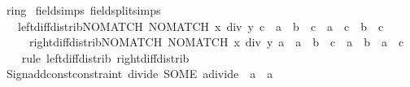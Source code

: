 \begin{isabellebody}
\isanewline
\isanewline
{}\isamarkupfalse%
\ ring\isanewline
{}\isanewline
\isanewline
{}\isamarkupfalse%
\ {\isacharbrackleft}{\kern0pt}field{\isacharunderscore}{\kern0pt}simps{\isacharcomma}{\kern0pt}\ field{\isacharunderscore}{\kern0pt}split{\isacharunderscore}{\kern0pt}simps{\isacharbrackright}{\kern0pt}{\isacharcolon}{\kern0pt}\isanewline
\ \ \ left{\isacharunderscore}{\kern0pt}diff{\isacharunderscore}{\kern0pt}distrib{\isacharunderscore}{\kern0pt}NO{\isacharunderscore}{\kern0pt}MATCH{\isacharcolon}{\kern0pt}\ {\isachardoublequoteopen}NO{\isacharunderscore}{\kern0pt}MATCH\ {\isacharparenleft}{\kern0pt}x\ div\ y{\isacharparenright}{\kern0pt}\ c\ {\isasymLongrightarrow}\ {\isacharparenleft}{\kern0pt}a\ {\isacharminus}{\kern0pt}\ b{\isacharparenright}{\kern0pt}\ {\isacharasterisk}{\kern0pt}\ c\ {\isacharequal}{\kern0pt}\ a\ {\isacharasterisk}{\kern0pt}\ c\ {\isacharminus}{\kern0pt}\ b\ {\isacharasterisk}{\kern0pt}\ c{\isachardoublequoteclose}\isanewline
\ \ \ \ \ right{\isacharunderscore}{\kern0pt}diff{\isacharunderscore}{\kern0pt}distrib{\isacharunderscore}{\kern0pt}NO{\isacharunderscore}{\kern0pt}MATCH{\isacharcolon}{\kern0pt}\ {\isachardoublequoteopen}NO{\isacharunderscore}{\kern0pt}MATCH\ {\isacharparenleft}{\kern0pt}x\ div\ y{\isacharparenright}{\kern0pt}\ a\ {\isasymLongrightarrow}\ a\ {\isacharasterisk}{\kern0pt}\ {\isacharparenleft}{\kern0pt}b\ {\isacharminus}{\kern0pt}\ c{\isacharparenright}{\kern0pt}\ {\isacharequal}{\kern0pt}\ a\ {\isacharasterisk}{\kern0pt}\ b\ {\isacharminus}{\kern0pt}\ a\ {\isacharasterisk}{\kern0pt}\ c{\isachardoublequoteclose}\isanewline
%
\isadelimproof
\ \ %
\endisadelimproof
%
\isatagproof
{}\isamarkupfalse%
\ {\isacharparenleft}{\kern0pt}rule\ left{\isacharunderscore}{\kern0pt}diff{\isacharunderscore}{\kern0pt}distrib\ right{\isacharunderscore}{\kern0pt}diff{\isacharunderscore}{\kern0pt}distrib{\isacharparenright}{\kern0pt}{\isacharplus}{\kern0pt}%
\endisatagproof
{\isafoldproof}%
%
\isadelimproof
\isanewline
%
\endisadelimproof
\isanewline
{}\isamarkupfalse%
\isanewline
%
\isadelimML
\isanewline
%
\endisadelimML
%
\isatagML
{}\isamarkupfalse%
\ {\isacartoucheopen}Sign{\isachardot}{\kern0pt}add{\isacharunderscore}{\kern0pt}const{\isacharunderscore}{\kern0pt}constraint\ {\isacharparenleft}{\kern0pt}\isactrlconstUNDERSCOREname {\isasymopen}divide{\isasymclose}{\isacharcomma}{\kern0pt}\ SOME\ \isactrltyp {\isasymopen}{\isacharprime}{\kern0pt}a{\isacharcolon}{\kern0pt}{\isacharcolon}{\kern0pt}divide\ {\isasymRightarrow}\ {\isacharprime}{\kern0pt}a\ {\isasymRightarrow}\ {\isacharprime}{\kern0pt}a{\isasymclose}{\isacharparenright}{\kern0pt}{\isacartoucheclose}%

\end{isabellebody}
